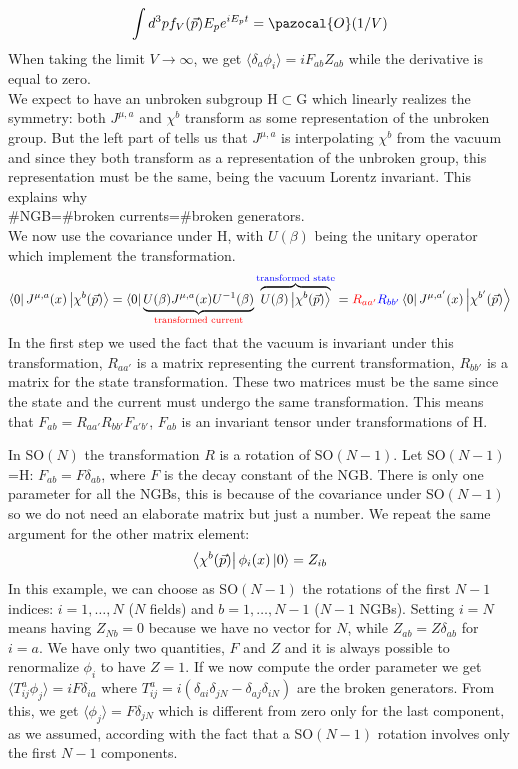 \documentclass[../main.tex]{subfiles}
\begin{document}
\[
\int d^3pf_V(\Vec{p})E_pe^{iE_pt}=\pazocal{O}(1/V)
\]
When taking the limit $V\to\infty$, we get
$\langle\delta_a\phi_i\rangle=iF_{ab}Z_{ab}$ while the derivative is equal to zero.\\
We expect to have an unbroken subgroup H$\subset$G which linearly realizes the symmetry: both $J^{\mu,a}$ and $\chi^b$ transform as some representation of the unbroken group. But the left part of  tells us that $J^{\mu,a}$ is interpolating $\chi^b$ from the vacuum and since they both transform as a representation of the unbroken group, this representation must be the same, being the vacuum Lorentz invariant. This explains why\\
\#NGB=\#broken currents=\#broken generators.\\
We now use the covariance under H, with $U(\beta)$ being the unitary operator which implement the transformation.
\[
\bra{0}J^{\mu,a}(x)\ket{\chi^b(\Vec{p})}=\bra{0}\underbrace{U(\beta)J^{\mu,a}(x)U^{-1}(\beta)}_{{\color{red}{\text{transformed current}}}}\overbrace{U(\beta)\ket{\chi^b(\Vec{p})}}^{{\color{blue}{\text{transformed state}}}}={\color{red}{R_{aa'}}}{\color{blue}{R_{bb'}}}\bra{0}J^{\mu,a'}(x)\ket{\chi^{b'}(\Vec{p})}
\]
In the first step we used the fact that the vacuum is invariant under this transformation, $R_{aa'}$ is a matrix representing the current transformation, $R_{bb'}$ is a matrix for the state transformation. These two matrices must be the same since the state and the current must undergo the same transformation. This means that $F_{ab}=R_{aa'}R_{bb'}F_{a'b'}$, $F_{ab}$ is an invariant tensor under transformations of H.
\begin{example}
In SO$(N)$ the transformation $R$ is a rotation of SO$(N-1)$. Let SO$(N-1)$=H: $F_{ab}=F\delta_{ab}$, where $F$ is the decay constant of the NGB. There is only one parameter for all the NGBs, this is because of the covariance under SO$(N-1)$ so we do not need an elaborate matrix but just a number. We repeat the same argument for the other matrix element:
\[
\bra{\chi^b(\Vec{p})}\phi_i(x)\ket{0}=Z_{ib}
\]
In this example, we can choose as SO$(N-1)$ the rotations of the first $N-1$ indices: $i=1,\dots,N$ ($N$ fields) and $b=1,\dots,N-1$ ($N-1$ NGBs). Setting $i=N$ means having $Z_{Nb}=0$ because we have no vector for $N$, while $Z_{ab}=Z\delta_{ab}$ for $i=a$. We have only two quantities, $F$ and $Z$ and it is always possible to renormalize $\phi_i$ to have $Z=1$. If we now compute the order parameter we get $\langle T_{ij}^a\phi_j\rangle=iF\delta_{ia}$ where $T_{ij}^a=i(\delta_{ai}\delta_{jN}-\delta_{aj}\delta_{iN})$ are the broken generators. From this, we get $\langle\phi_j\rangle=F\delta_{jN}$ which is different from zero only for the last component, as we assumed, according with the fact that a SO$(N-1)$ rotation involves only the first $N-1$ components.
\end{example}
\end{document}
